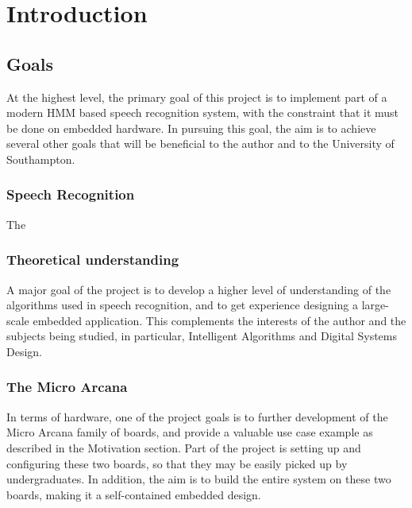 \chapter{Introduction} %
\label{cha:introduction}


\section{Goals} %
\label{sec:goals}
	At the highest level, the primary goal of this project is to implement part of a modern HMM based speech recognition system, with the constraint that it must be done on embedded hardware.  In pursuing this goal, the aim is to achieve several other goals that will be beneficial to the author and to the University of Southampton.

	\subsection{Speech Recognition} %
	\label{sec:speech_recognition}
		The 

	\subsection{Theoretical understanding} %
	\label{sec:theoretical_understanding}
		A major goal of the project is to develop a higher level of understanding of the algorithms used in speech recognition, and to get experience designing a large-scale embedded application.  This complements the interests of the author and the subjects being studied, in particular, Intelligent Algorithms and Digital Systems Design.

	\subsection{The Micro Arcana} %
	\label{sec:the_micro_arcana}
		In terms of hardware, one of the project goals is to further development of the Micro Arcana family of boards, and provide a valuable use case example as described in the Motivation section.  Part of the project is setting up and configuring these two boards, so that they may be easily picked up by undergraduates.  In addition, the aim is to build the entire system on these two boards, making it a self-contained embedded design.

